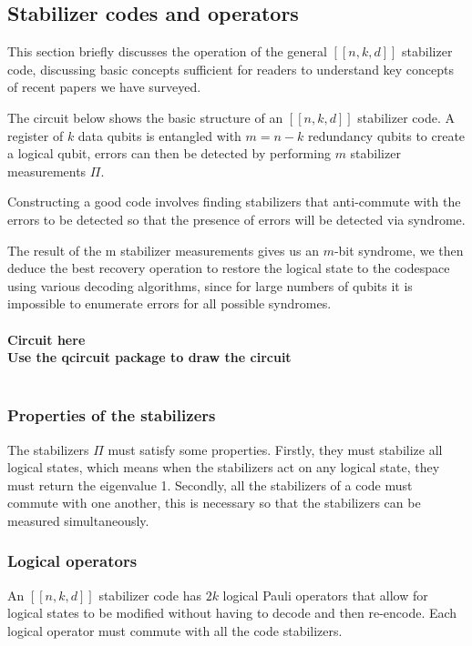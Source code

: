 \documentclass[final,5p,times,twocolumn,authoryear]{elsarticle}
\begin{document}
\subsection{Stabilizer codes and operators}

This section briefly discusses the operation of the general $[[n, k, d]]$ stabilizer code, discussing basic concepts sufficient for readers to understand key concepts of recent papers we have surveyed.

The circuit below shows the basic structure of an $[[n,k,d]]$ stabilizer code. A register of $k$ data qubits is entangled with $m = n - k$ redundancy qubits to create a logical qubit, errors can then be detected by performing $m$ stabilizer measurements $\Pi$. 

Constructing a good code involves finding stabilizers that anti-commute with the errors to be detected so that the presence of errors will be detected via syndrome.

The result of the m stabilizer measurements gives us an $m$-bit syndrome, we then deduce the best recovery operation to restore the logical state to the codespace using various decoding algorithms, since for large numbers of qubits it is impossible to enumerate errors for all possible syndromes.
\\
\\
\textbf{Circuit here}
\\
\textbf{Use the qcircuit package to draw the circuit}
\\
\\
\subsubsection{Properties of the stabilizers}

The stabilizers $\Pi$ must satisfy some properties. Firstly, they must stabilize all logical states, which means when the stabilizers act on any logical state, they must return the eigenvalue 1. Secondly, all the stabilizers of a code must commute with one another, this is necessary so that the stabilizers can be measured simultaneously.

\subsubsection{Logical operators}

An $[[n,k,d]]$ stabilizer code has $2k$ logical Pauli operators that allow for logical states to be modified without having to decode and then re-encode. Each logical operator must commute with all the code stabilizers.
\end{document}

